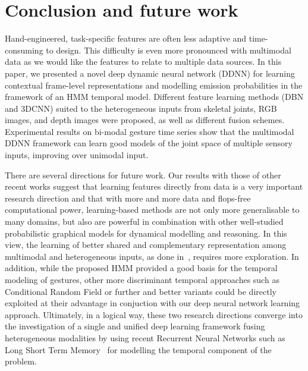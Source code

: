 
\section{Conclusion and future work}
\label{sec:conclusion}

Hand-engineered, task-specific features are often less adaptive and time-consuming to design.
This difficulty is even more pronounced with multimodal data as we would like the features
to relate to multiple data sources.
%
In this paper, we presented a novel deep dynamic neural network (DDNN)
for learning contextual frame-level representations and modelling emission probabilities in the framework of an HMM temporal model.
%
Different feature learning methods (DBN and 3DCNN) suited to the heterogeneous inputs from skeletal joints, RGB images, and depth images
were proposed, as well as different fusion schemes.
%
Experimental results on bi-modal gesture time series  show that the multimodal DDNN framework can learn
good models of the joint space of multiple sensory inputs, improving over  unimodal input.



There are several directions for future work.
%
Our results with those of other recent works suggest that learning features directly from data is a very important research direction
and that with more and more data and flops-free  computational power, learning-based methods are not only more generalisable to many domains,
but also are powerful in combination  with other well-studied probabilistic graphical models
for dynamical modelling and reasoning.
%
In this view, the learning of  better shared and complementary representation among multimodal  and heterogeneous  inputs,
as done in~\cite{neverova2014moddrop}, requires more exploration.
%
In addition, while the proposed HMM provided a good basis for the temporal modeling of gestures,
other more discriminant temporal approaches such as Conditional Random Field or further and better variants
\cite{wang2006hidden} could be directly exploited at their advantage in conjuction with our deep neural network  learning approach.
%
Ultimately, in a logical way, these two research directions converge into the investigation of
a single and unified deep learning framework fusing heterogeneous modalities
by using recent Recurrent Neural Networks such as Long Short Term Memory~\cite{graves2009novel} for modelling the temporal component of the problem.


\endinput

